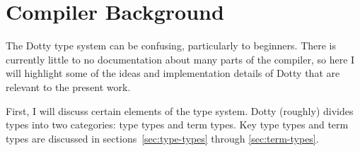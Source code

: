 \documentclass[11pt]{report}
\begin{document}
\begin{comment}
One major question I pursued in the present work was how best to encode mutability information into the Dotty type system. Rather than encoding mutability information as a type system separate from the host language's type system, I thought it important to look for an integrated approach that (where possible) relies on the host language's type system to perform some of the ``heavy lifiting.'' 

Much previous work on reference immutability and side effects has entailed the development of new reference-immutability-specific or effect-encoding type systems. For example, Reim~\cite{} introduces a system of type qualifiers that are orthogonal to Java types, and Rytz's work on effect systems for Scala~\cite{} involves intraprocedural analysis and typing rules that are essentially independent of Scala's type system.

However, there is a problem with the creation of type systems orthogonal to the host language's type system: as the complexity of the host language and the new type system increases, there is a very real risk of substantial duplication of development effort. The Scala language, DOT type system, and Dotty compiler support a degree of modularity, flexibility, and practicality that is unprecedented among statically-typed languages, but at the cost of a very long and difficult development process. For a new type system to approach the complexity ...

\end{comment}




\chapter{Compiler Background}

The Dotty type system can be confusing, particularly to beginners.
There is currently little to no documentation about many parts of the compiler,
so here I will highlight some of the ideas and implementation details of Dotty
that are relevant to the present work.

First, I will discuss certain elements of the type system.
Dotty (roughly) divides types into two categories: type types and term types.
Key type types and term types are discussed in sections~\ref{sec:type-types} through \ref{sec:term-types}.
\end{document}
